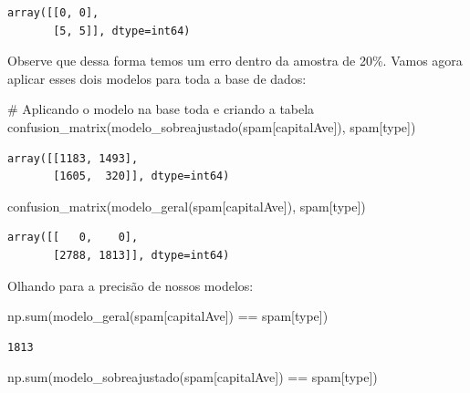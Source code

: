 \documentclass[
  letterpaper,
  DIV=11,
  numbers=noendperiod]{scrreprt}
\newenvironment{Shaded}{\begin{snugshade}}{\end{snugshade}}
\newcommand{\BuiltInTok}[1]{\textcolor[rgb]{0.00,0.23,0.31}{#1}}
\newcommand{\CommentTok}[1]{\textcolor[rgb]{0.37,0.37,0.37}{#1}}
\newcommand{\NormalTok}[1]{\textcolor[rgb]{0.00,0.23,0.31}{#1}}
\newcommand{\OperatorTok}[1]{\textcolor[rgb]{0.37,0.37,0.37}{#1}}
\newcommand{\StringTok}[1]{\textcolor[rgb]{0.13,0.47,0.30}{#1}}
\begin{document}
\begin{verbatim}
array([[0, 0],
       [5, 5]], dtype=int64)
\end{verbatim}

Observe que dessa forma temos um erro dentro da amostra de 20\%. Vamos
agora aplicar esses dois modelos para toda a base de dados:

\begin{Shaded}
\begin{Highlighting}[]
\CommentTok{\# Aplicando o modelo na base toda e criando a tabela}
\NormalTok{confusion\_matrix(modelo\_sobreajustado(spam[}\StringTok{\textquotesingle{}capitalAve\textquotesingle{}}\NormalTok{]), spam[}\StringTok{\textquotesingle{}type\textquotesingle{}}\NormalTok{])}
\end{Highlighting}
\end{Shaded}

\begin{verbatim}
array([[1183, 1493],
       [1605,  320]], dtype=int64)
\end{verbatim}

\begin{Shaded}
\begin{Highlighting}[]
\NormalTok{confusion\_matrix(modelo\_geral(spam[}\StringTok{\textquotesingle{}capitalAve\textquotesingle{}}\NormalTok{]), spam[}\StringTok{\textquotesingle{}type\textquotesingle{}}\NormalTok{])}
\end{Highlighting}
\end{Shaded}

\begin{verbatim}
array([[   0,    0],
       [2788, 1813]], dtype=int64)
\end{verbatim}

Olhando para a precisão de nossos modelos:

\begin{Shaded}
\begin{Highlighting}[]
\NormalTok{np.}\BuiltInTok{sum}\NormalTok{(modelo\_geral(spam[}\StringTok{\textquotesingle{}capitalAve\textquotesingle{}}\NormalTok{]) }\OperatorTok{==}\NormalTok{ spam[}\StringTok{\textquotesingle{}type\textquotesingle{}}\NormalTok{])}
\end{Highlighting}
\end{Shaded}

\begin{verbatim}
1813
\end{verbatim}

\begin{Shaded}
\begin{Highlighting}[]
\NormalTok{np.}\BuiltInTok{sum}\NormalTok{(modelo\_sobreajustado(spam[}\StringTok{\textquotesingle{}capitalAve\textquotesingle{}}\NormalTok{]) }\OperatorTok{==}\NormalTok{ spam[}\StringTok{\textquotesingle{}type\textquotesingle{}}\NormalTok{])}
\end{Highlighting}
\end{Shaded}
\end{document}
